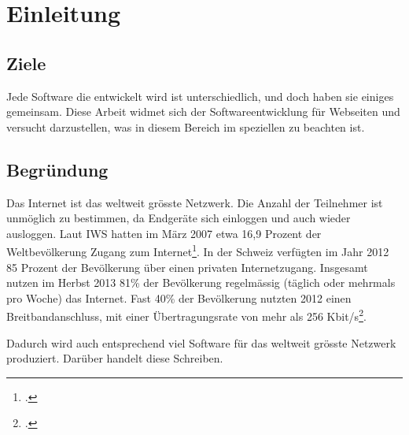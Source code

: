 \chapter{Einleitung}

\section{Ziele}
Jede Software die entwickelt wird ist unterschiedlich, und doch haben sie einiges gemeinsam. Diese Arbeit widmet sich der Softwareentwicklung für Webseiten und versucht darzustellen, was in diesem Bereich im speziellen zu beachten ist.

\section{Begründung}
Das Internet ist das weltweit grösste Netzwerk. Die Anzahl der Teilnehmer ist unmöglich zu bestimmen, da Endgeräte sich einloggen und auch wieder ausloggen. Laut IWS hatten im März 2007 etwa 16,9 Prozent der Weltbevölkerung Zugang zum Internet\footcite{World_Internet_Users_Statistics2015-05-30}. In der Schweiz verfügten im Jahr 2012 85 Prozent der Bevölkerung über einen privaten Internetzugang. Insgesamt nutzen im Herbst 2013 81\% der Bevölkerung regelmässig (täglich oder mehrmals pro Woche) das Internet. Fast 40\% der Bevölkerung nutzten 2012 einen Breitbandanschluss, mit einer Übertragungsrate von mehr als 256 Kbit/s\footcite{Internet__Wikipedia_2015-05-30}.

Dadurch wird auch entsprechend viel Software für das weltweit grösste Netzwerk produziert. Darüber handelt diese Schreiben.

